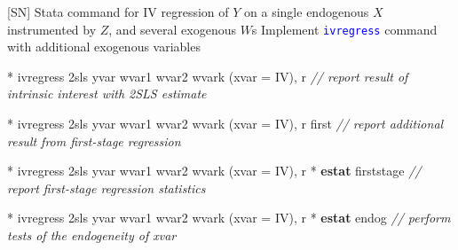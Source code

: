 \documentclass[
  10pt,
  ignorenonframetext,
]{beamer}
\newenvironment{Shaded}{\begin{snugshade}}{\end{snugshade}}
\newcommand{\CommentTok}[1]{\textcolor[rgb]{0.56,0.35,0.01}{\textit{#1}}}
\newcommand{\FunctionTok}[1]{\textcolor[rgb]{0.00,0.00,0.00}{#1}}
\newcommand{\KeywordTok}[1]{\textcolor[rgb]{0.13,0.29,0.53}{\textbf{#1}}}
\newcommand{\NormalTok}[1]{#1}
\begin{document}
\begin{frame}[fragile]{{[}SN{]} Stata command for IV regression of \(Y\)
on a single endogenous \(X\) instrumented by \(Z\), and several
exogenous \(W\)s}
\protect\hypertarget{sn-stata-command-for-iv-regression-of-y-on-a-single-endogenous-x-instrumented-by-z-and-several-exogenous-ws}{}
Implement \textcolor{blue}{\texttt{ivregress}} command with additional
exogenous variables

\small

\begin{Shaded}
\begin{Highlighting}[]
\NormalTok{* ivregress 2sls yvar wvar1 wvar2 wvark (xvar = IV), }\FunctionTok{r}
\CommentTok{// report result of intrinsic interest with 2SLS estimate}
\end{Highlighting}
\end{Shaded}

\begin{Shaded}
\begin{Highlighting}[]
\NormalTok{* ivregress 2sls yvar wvar1 wvar2 wvark (xvar = IV), }\FunctionTok{r}\NormalTok{ first}
\CommentTok{// report additional result from first{-}stage regression}
\end{Highlighting}
\end{Shaded}

\begin{Shaded}
\begin{Highlighting}[]
\NormalTok{* ivregress 2sls yvar wvar1 wvar2 wvark (xvar = IV), }\FunctionTok{r}
\NormalTok{* }\KeywordTok{estat}\NormalTok{ firststage}
\CommentTok{// report first{-}stage regression statistics}
\end{Highlighting}
\end{Shaded}

\begin{Shaded}
\begin{Highlighting}[]
\NormalTok{* ivregress 2sls yvar wvar1 wvar2 wvark (xvar = IV), }\FunctionTok{r}
\NormalTok{* }\KeywordTok{estat}\NormalTok{ endog}
\CommentTok{// perform tests of the endogeneity of xvar}
\end{Highlighting}
\end{Shaded}
\end{frame}
\end{document}
